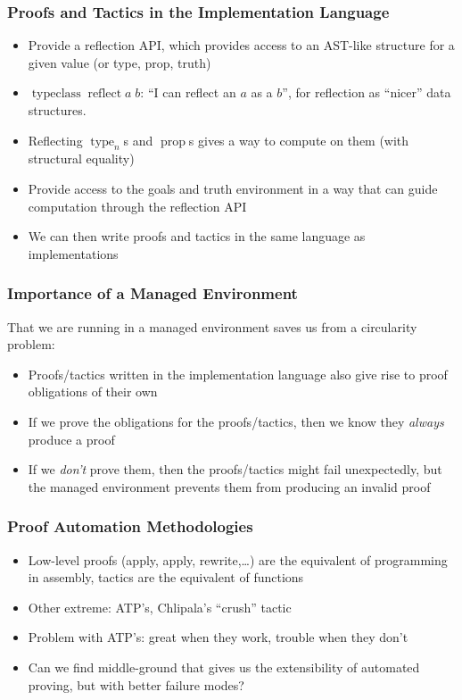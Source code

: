 \documentclass{beamer}
\newcommand{\typekw}[1]{\ensuremath{{\operatorname{type}}_{#1}}}
\newcommand{\propkw}{\ensuremath{\operatorname{prop}}}
\begin{document}
\begin{frame}
  \frametitle{Proofs and Tactics in the Implementation Language}
  \begin{itemize}
    \item Provide a reflection API, which provides access to an
      AST-like structure for a given value (or type, prop, truth)
    \item $\operatorname{typeclass} \operatorname{reflect} a\; b$: ``I can
      reflect an $a$ as a $b$'', for reflection as ``nicer'' data
      structures.
    \item Reflecting \typekw{n}s and \propkw{}s gives a way to compute
      on them (with structural equality)
    \item Provide access to the goals and truth environment in a way
      that can guide computation through the reflection API
    \item We can then write proofs and tactics in the same language as
      implementations
  \end{itemize}
\end{frame}

\begin{frame}
  \frametitle{Importance of a Managed Environment}
  That we are running in a managed environment saves us from a
  circularity problem:
  \begin{itemize}
    \item Proofs/tactics written in the implementation language also
      give rise to proof obligations of their own
    \item If we prove the obligations for the proofs/tactics, then we
      know they \emph{always} produce a proof
    \item If we \emph{don't} prove them, then the proofs/tactics might
      fail unexpectedly, but the managed environment prevents them
      from producing an invalid proof
  \end{itemize}
\end{frame}

\begin{frame}
  \frametitle{Proof Automation Methodologies}
  \begin{itemize}
    \item Low-level proofs (apply, apply, rewrite,\ldots) are the
      equivalent of programming in assembly, tactics are the
      equivalent of functions
    \item Other extreme: ATP's, Chlipala's ``crush'' tactic
    \item Problem with ATP's: great when they work, trouble when they don't
    \item Can we find middle-ground that gives us the extensibility of
      automated proving, but with better failure modes?
  \end{itemize}
\end{frame}
\end{document}
